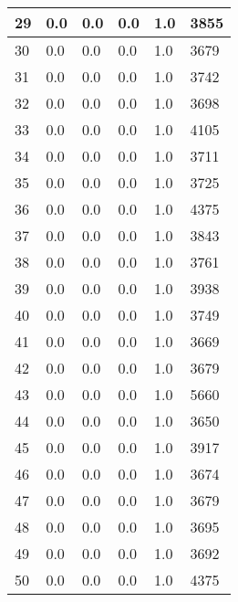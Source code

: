\begin{longtable}{|l|l|l|l|l|l|}
29 & 0.0 & 0.0 & 0.0 & 1.0 & 3855 \\ \hline 
30 & 0.0 & 0.0 & 0.0 & 1.0 & 3679 \\ \hline 
31 & 0.0 & 0.0 & 0.0 & 1.0 & 3742 \\ \hline 
32 & 0.0 & 0.0 & 0.0 & 1.0 & 3698 \\ \hline 
33 & 0.0 & 0.0 & 0.0 & 1.0 & 4105 \\ \hline 
34 & 0.0 & 0.0 & 0.0 & 1.0 & 3711 \\ \hline 
35 & 0.0 & 0.0 & 0.0 & 1.0 & 3725 \\ \hline 
36 & 0.0 & 0.0 & 0.0 & 1.0 & 4375 \\ \hline 
37 & 0.0 & 0.0 & 0.0 & 1.0 & 3843 \\ \hline 
38 & 0.0 & 0.0 & 0.0 & 1.0 & 3761 \\ \hline 
39 & 0.0 & 0.0 & 0.0 & 1.0 & 3938 \\ \hline 
40 & 0.0 & 0.0 & 0.0 & 1.0 & 3749 \\ \hline 
41 & 0.0 & 0.0 & 0.0 & 1.0 & 3669 \\ \hline 
42 & 0.0 & 0.0 & 0.0 & 1.0 & 3679 \\ \hline 
43 & 0.0 & 0.0 & 0.0 & 1.0 & 5660 \\ \hline 
44 & 0.0 & 0.0 & 0.0 & 1.0 & 3650 \\ \hline 
45 & 0.0 & 0.0 & 0.0 & 1.0 & 3917 \\ \hline 
46 & 0.0 & 0.0 & 0.0 & 1.0 & 3674 \\ \hline 
47 & 0.0 & 0.0 & 0.0 & 1.0 & 3679 \\ \hline 
48 & 0.0 & 0.0 & 0.0 & 1.0 & 3695 \\ \hline 
49 & 0.0 & 0.0 & 0.0 & 1.0 & 3692 \\ \hline 
50 & 0.0 & 0.0 & 0.0 & 1.0 & 4375 \\ \hline 
\end{longtable}